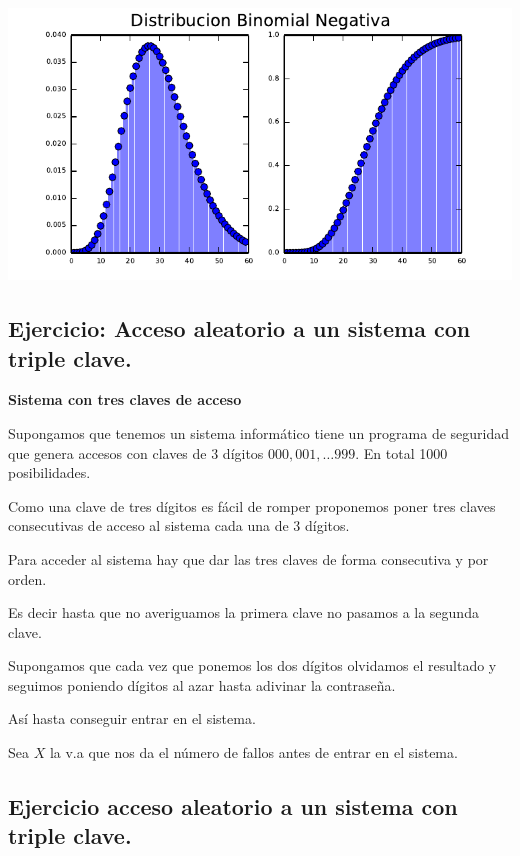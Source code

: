 \documentclass[]{book}
\begin{document}
\includegraphics{curso-probabilidad-udemy_files/figure-latex/negativa_py_show-1.pdf}

\hypertarget{ejercicio-acceso-aleatorio-a-un-sistema-con-triple-clave.}{%
\subsection{Ejercicio: Acceso aleatorio a un sistema con triple clave.}\label{ejercicio-acceso-aleatorio-a-un-sistema-con-triple-clave.}}

\textbf{Sistema con tres claves de acceso}

Supongamos que tenemos un sistema informático tiene un programa de seguridad que genera accesos con claves de 3 dígitos \(000,001,\ldots 999\). En total 1000 posibilidades.

Como una clave de tres dígitos es fácil de romper proponemos poner tres claves consecutivas de acceso al sistema cada una de 3 dígitos.

Para acceder al sistema hay que dar las tres claves de forma consecutiva y por orden.

Es decir hasta que no averiguamos la primera clave no pasamos a la segunda clave.

Supongamos que cada vez que ponemos los dos dígitos olvidamos el resultado y seguimos poniendo dígitos al azar hasta adivinar la contraseña.

Así hasta conseguir entrar en el sistema.

Sea \(X\) la v.a que nos da el número de fallos antes de entrar en el sistema.

\hypertarget{ejercicio-acceso-aleatorio-a-un-sistema-con-triple-clave.-1}{%
\subsection{Ejercicio acceso aleatorio a un sistema con triple clave.}\label{ejercicio-acceso-aleatorio-a-un-sistema-con-triple-clave.-1}}
\end{document}
